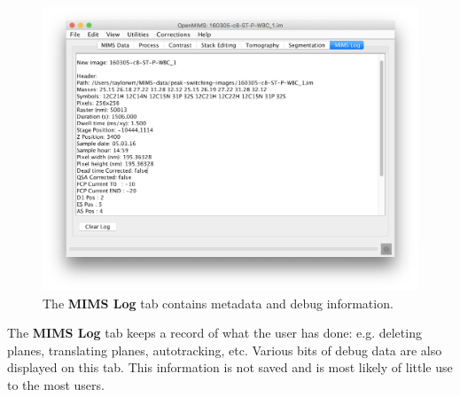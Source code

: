 \documentclass{article}
\begin{document}
	\begin{figure}[ht]
	\centering
	\includegraphics[scale=0.70]{snapshotMIMSlog.png}
	\caption{The \textbf{MIMS Log} tab contains metadata and debug information.}
	\end{figure}
	
	The \textbf{MIMS Log} tab keeps a record of what the user has done: 
	e.g. deleting planes, translating planes, autotracking, etc. Various bits
	of debug data are also displayed on this tab.
	This information is not saved and is most likely of little use to the most users.


	
   

\newpage
\end{document}
